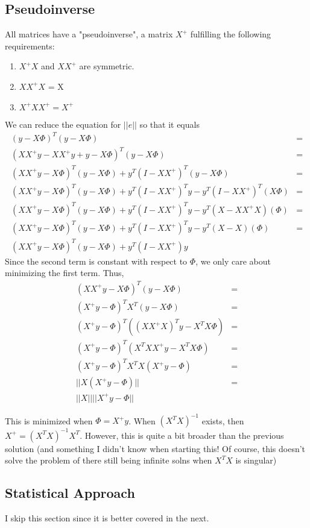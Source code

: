 \documentclass{article}
\begin{document}
\subsection{Pseudoinverse}
All matrices have a "pseudoinverse", a matrix $X^+$ fulfilling the following requirements:
\begin{enumerate}
    \item $X^+X$ and $XX^+$ are symmetric.
    \item $XX^+X$ = X
    \item $X^+XX^+ = X^+$
\end{enumerate}
We can reduce the equation for $||e||$ so that it equals \begin{align*}
    (y - X\Phi)^T(y - X\Phi) &= \\
    (XX^+y - XX^+y + y - X\Phi)^T(y - X\Phi) &= \\
    (XX^+y - X\Phi)^T(y - X\Phi) + y^T(I - XX^+)^T(y - X\Phi) &= \\
    (XX^+y - X\Phi)^T(y - X\Phi) + y^T(I - XX^+)^Ty - y^T(I - XX^+)^T(X\Phi) &= \\
    (XX^+y - X\Phi)^T(y - X\Phi) + y^T(I - XX^+)^Ty - y^T(X - XX^+X)(\Phi) &= \\
    (XX^+y - X\Phi)^T(y - X\Phi) + y^T(I - XX^+)^Ty - y^T(X - X)(\Phi) &= \\
    (XX^+y - X\Phi)^T(y - X\Phi) + y^T(I - XX^+)y
\end{align*}
Since the second term is constant with respect to $\Phi$, we only care about minimizing
the first term. Thus, \begin{align*}
    (XX^+y - X\Phi)^T(y - X\Phi) &= \\
    (X^+y - \Phi)^TX^T(y - X\Phi) &= \\
    (X^+y - \Phi)^T((XX^+X)^Ty - X^TX\Phi) &= \\
    (X^+y - \Phi)^T(X^TXX^+y - X^TX\Phi) &= \\
    (X^+y - \Phi)^TX^TX(X^+y - \Phi) &= \\
    ||X(X^+y - \Phi)|| &= \\
    ||X|| ||X^+y - \Phi||
\end{align*}

This is minimized when $\Phi = X^+y$. When $(X^TX)^{-1}$ exists, then $X^+ = (X^TX)^{-1}X^T$.
However, this is quite a bit broader than the previous solution 
(and something I didn't know when starting this! Of course, this doesn't 
solve the problem of there still being infinite solns when $X^TX$ is singular)

\subsection{Statistical Approach}
I skip this section since it is better covered in the next. 
\end{document}
